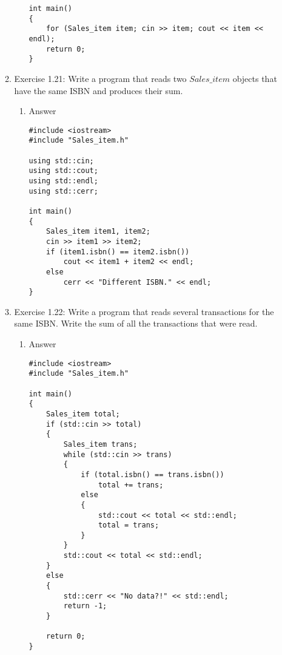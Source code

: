 \documentclass[11pt]{article}
\begin{document}
\begin{enumerate}
\begin{enumerate}
\begin{enumerate}
\begin{verbatim}
int main()
{
    for (Sales_item item; cin >> item; cout << item << endl);
    return 0;
}
\end{verbatim}
\end{enumerate}
\item Exercise 1.21: Write a program that reads two $Sales\_item$ objects that have the same ISBN and produces their sum.
\label{sec-1-5-1-3-2}
\begin{enumerate}
\item Answer
\label{sec-1-5-1-3-2-1}
\begin{verbatim}
#include <iostream>
#include "Sales_item.h"

using std::cin;
using std::cout;
using std::endl;
using std::cerr;

int main()
{
    Sales_item item1, item2;
    cin >> item1 >> item2;
    if (item1.isbn() == item2.isbn())
        cout << item1 + item2 << endl;
    else
        cerr << "Different ISBN." << endl;
}
\end{verbatim}
\end{enumerate}
\item Exercise 1.22: Write a program that reads several transactions for the same ISBN. Write the sum of all the transactions that were read.
\label{sec-1-5-1-3-3}
\begin{enumerate}
\item Answer
\label{sec-1-5-1-3-3-1}
\begin{verbatim}
#include <iostream>
#include "Sales_item.h"

int main()
{
    Sales_item total;
    if (std::cin >> total)
    {
        Sales_item trans;
        while (std::cin >> trans)
        {
            if (total.isbn() == trans.isbn())
                total += trans;
            else
            {
                std::cout << total << std::endl;
                total = trans;
            }
        }
        std::cout << total << std::endl;
    }
    else
    {
        std::cerr << "No data?!" << std::endl;
        return -1;
    }

    return 0;
}
\end{verbatim}
\end{enumerate}
\end{enumerate}
\end{enumerate}
\end{document}
